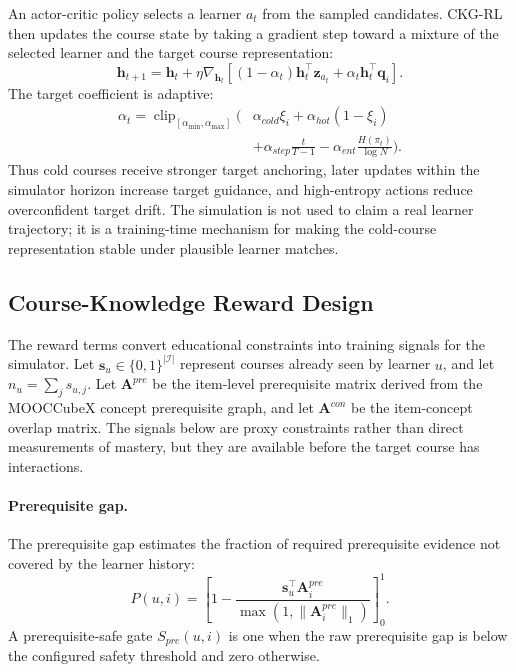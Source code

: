 \documentclass[sigconf,anonymous,review]{acmart}
\begin{document}
An actor-critic policy selects a learner \(a_t\) from the sampled candidates. CKG-RL then updates the course state by taking a gradient step toward a mixture of the selected learner and the target course representation:
\begin{equation}
\mathbf{h}_{t+1}=\mathbf{h}_t+\eta
\nabla_{\mathbf{h}_t}
\left[
(1-\alpha_t)\mathbf{h}_t^\top\mathbf{z}_{a_t}
+\alpha_t\mathbf{h}_t^\top\mathbf{q}_i
\right].
\end{equation}
The target coefficient is adaptive:
\begin{align}
\alpha_t=
\operatorname{clip}_{[\alpha_{\min},\alpha_{\max}]}\Big(
&\alpha_{cold}\xi_i+\alpha_{hot}(1-\xi_i) \nonumber\\
&+\alpha_{step}\frac{t}{T-1}
-\alpha_{ent}\frac{H(\pi_t)}{\log N}
\Big).
\end{align}
Thus cold courses receive stronger target anchoring, later updates within the simulator horizon increase target guidance, and high-entropy actions reduce overconfident target drift. The simulation is not used to claim a real learner trajectory; it is a training-time mechanism for making the cold-course representation stable under plausible learner matches.

\subsection{Course-Knowledge Reward Design}
The reward terms convert educational constraints into training signals for the simulator. Let \(\mathbf{s}_u\in\{0,1\}^{|\mathcal{I}|}\) represent courses already seen by learner \(u\), and let \(n_u=\sum_j s_{u,j}\). Let \(\mathbf{A}^{pre}\) be the item-level prerequisite matrix derived from the MOOCCubeX concept prerequisite graph, and let \(\mathbf{A}^{con}\) be the item-concept overlap matrix. The signals below are proxy constraints rather than direct measurements of mastery, but they are available before the target course has interactions.

\paragraph{Prerequisite gap.}
The prerequisite gap estimates the fraction of required prerequisite evidence not covered by the learner history:
\begin{equation}
P(u,i)=
\left[
1-\frac{\mathbf{s}_u^\top \mathbf{A}^{pre}_{i}}
{\max(1,\|\mathbf{A}^{pre}_{i}\|_1)}
\right]_0^1.
\end{equation}
A prerequisite-safe gate \(S_{pre}(u,i)\) is one when the raw prerequisite gap is below the configured safety threshold and zero otherwise.
\end{document}
